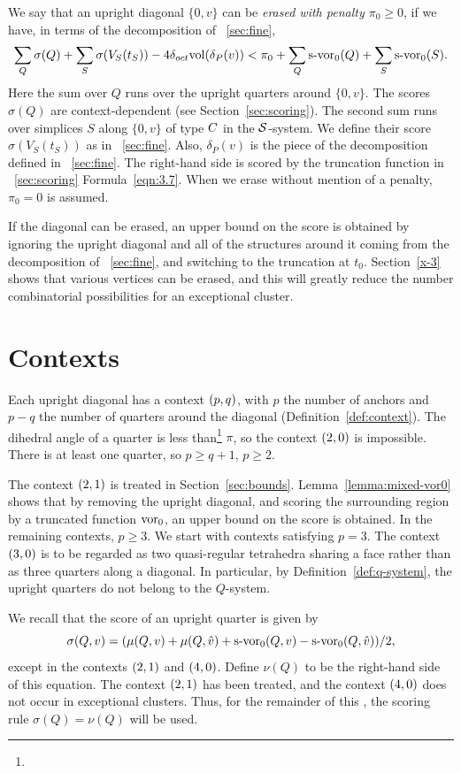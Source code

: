 We say that an upright diagonal $\{0,v\}$ can be {\it erased with
penalty $\pi_0\ge0$}, if we have, in terms of the  decomposition
of \Chap~\ref{sec:fine},
    $$
    \sum_Q\sigma(Q) +\sum_S\sigma(V_S(t_S)) - 4\delta_{oct}{\operatorname{vol}}(\delta_P(v))<
        \pi_0+\sum_Q\operatorname{s-vor}_0(Q) +\sum_S\operatorname{s-vor}_0(S).
    $$
Here the sum over $Q$ runs over the upright quarters around
$\{0,v\}$. The scores $\sigma(Q)$ are context-dependent (see
Section~\ref{sec:scoring}). The second sum runs over simplices $S$
along $\{0,v\}$ of type $C$ in the ${\mathcal S}$-system.  We define
their score $\sigma(V_S(t_S))$ as in \Chap~\ref{sec:fine}. Also,
$\delta_P(v)$ is the piece of the decomposition defined in
\Chap~\ref{sec:fine}. The right-hand side is scored by the
truncation function in \Chap~\ref{sec:scoring}
Formula~\ref{eqn:3.7}. When we erase without mention of a penalty,
$\pi_0=0$ is assumed.

If the diagonal can be erased, an upper bound on the score is
obtained by ignoring the upright diagonal and all of the
structures around it coming from the decomposition of
\Chap~\ref{sec:fine}, and switching to the truncation at $t_0$.
Section~\ref{x-3} shows that various vertices can be erased, and
this will greatly reduce the number combinatorial possibilities
for an exceptional cluster.

\section{Contexts}

Each upright diagonal has a context $\relax(p,q)$, with $p$ the number
of anchors and $p-q$ the number of quarters around the diagonal
(Definition~\ref{def:context}). The dihedral angle of a quarter is
less than\footnote{} $\pi$, so the context
$\relax(2,0)$ is impossible. There is at least one quarter, so $p\ge
q+1$, $p\ge2$.

The context $\relax(2,1)$ is treated in Section~\ref{sec:bounds}.
Lemma~\ref{lemma:mixed-vor0} shows that by removing the upright
diagonal, and scoring the surrounding region by a truncated
function $\operatorname{vor}_0$, an upper bound on the score is obtained. In the
remaining contexts, $p\ge3$. We start with contexts satisfying
$p=3$. The context $\relax(3,0)$ is to be regarded as two
quasi-regular tetrahedra sharing a face rather than as three
quarters along a diagonal.  In particular, by
Definition~\ref{def:q-system}, the upright quarters do not belong
to the $Q$-system.

We recall that the score of an upright quarter is given by
$$\sigma(Q,v)=(\mu(Q,v)+\mu(Q,\hat v) + \operatorname{s-vor}_0(Q,v)-\operatorname{s-vor}_0(Q,\hat v))/2,$$
except in the contexts $\relax(2,1)$ and $\relax(4,0)$.  Define $\nu(Q)$
to be the right-hand side of this equation.  The
context $\relax(2,1)$ has been treated, and the context $\relax(4,0)$ does
not occur in exceptional clusters. Thus, for the remainder of this
\chap, the scoring rule $\sigma(Q)=\nu(Q)$ will be used.

